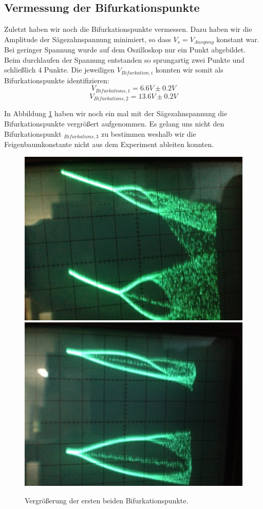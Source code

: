 \documentclass{scrartcl}
\begin{document}
\subsection { Vermessung der Bifurkationspunkte }
Zuletzt haben wir noch die Bifurkationspunkte vermessen. Dazu haben wir die Amplitude der Sägezahnspannung minimiert, so dass $V_s=V_{Ausgang}$ konstant war. Bei geringer Spannung wurde auf dem Oszilloskop nur ein Punkt abgebildet. Beim durchlaufen der Spannung entstanden so sprungartig zwei Punkte und schließlich 4 Punkte. Die jeweiligen $V_{Bifurkation, i}$ konnten wir somit als Bifurkationspunkte identifizieren: 
$$V_{Bifurkations, 1}=6.6V \pm 0.2V$$
$$V_{Bifurkations, 2}=13.6V \pm 0.2V$$

In Abbildung \ref{fig:ldr-bifurc-zoom} haben wir noch ein mal mit der Sägezahnspannung die Bifurkationspunkte vergrößert aufgenommen. Es gelang uns nicht den Bifurkationspunkt $_{Bifurkations, 3}$ zu bestimmen weshalb wir die Feigenbaumkonstante nicht aus dem Experiment ableiten konnten.

\begin{figure}[!htbp]
\centering
\includegraphics[scale=0.18]{bif-ldr/bifurc-zoom}
\includegraphics[scale=0.18]{bif-ldr/bifurc-zoom2}
\caption{Vergrößerung der ersten beiden Bifurkationspunkte.}
\label{fig:ldr-bifurc-zoom}
\end{figure}
\end{document}
